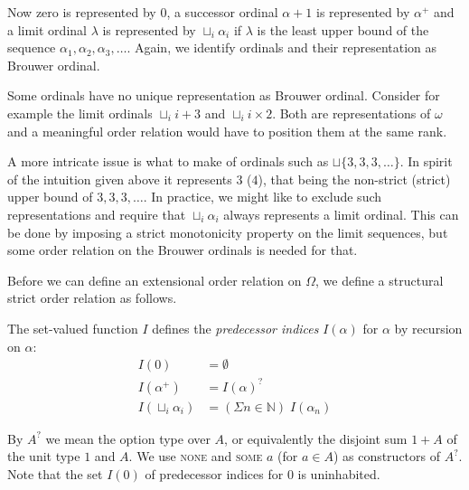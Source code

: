 Now zero is represented by $0$, a successor ordinal $\alpha +1$ is represented
by $\alpha^+$ and a limit ordinal $\lambda$ is represented by $\sqcup_i
\alpha_i$ if $\lambda$ is the least upper bound of the sequence $\alpha_1,
\alpha_2, \alpha_3, \ldots$. %
Again, we identify ordinals and their representation as Brouwer ordinal.

Some ordinals have no unique representation as Brouwer ordinal. Consider for
example the limit ordinals $\sqcup_i i + 3$ and $\sqcup_i i \times 2$. Both
are representations of $\omega$ and a meaningful order relation would have to
position them at the same rank.

A more intricate issue is what to make of ordinals such as $\sqcup \{ 3, 3, 3,
\ldots \}$. In spirit of the intuition given above it represents $3$ ($4$),
that being the non-strict (strict) upper bound of $3, 3, 3, \ldots$.
In practice, we might like to exclude such representations and require that
$\sqcup_i \alpha_i$ always represents a limit ordinal. This can be done by
imposing a strict monotonicity property on the limit sequences, but some order
relation on the Brouwer ordinals is needed for that.


Before we can define an extensional order relation on $\Omega$, we define a
structural strict order relation as follows.

\begin{definition}%
The set-valued function $I$ defines the \emph{predecessor indices} $I(\alpha)$
for $\alpha$ by recursion on $\alpha$:
\begin{align*}
  I(0)                 &= \emptyset \\
  I(\alpha^+)          &= I(\alpha)^? \\
  I(\sqcup_i \alpha_i) &= (\Sigma n \in \mathbb{N}) \; I(\alpha_n)
\end{align*}
\end{definition}


By $A^?$ we mean the option type over $A$, or equivalently the disjoint sum
$1 + A$ of the unit type $1$ and $A$. We use \textsc{none} and \textsc{some
  $a$} (for $a \in A$) as constructors of $A^?$. Note that the set $I(0)$ of
predecessor indices for $0$ is uninhabited.

